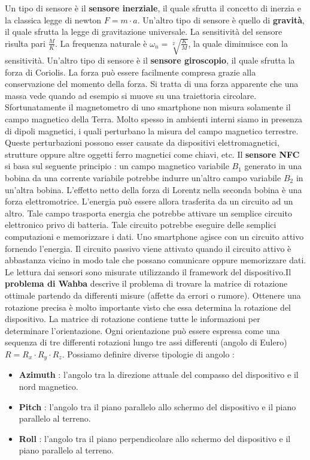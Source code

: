 \documentclass[12pt]{report}
\begin{document}
Un tipo di sensore è il \textbf{sensore inerziale}, il quale sfrutta il concetto di inerzia e la classica legge di newton $F = m\cdot a$. Un'altro tipo di sensore è quello di \textbf{gravità}, il quale sfrutta la legge di gravitazione universale. La sensitività del sensore risulta pari $\frac{M}{K}$. La frequenza naturale è $\omega_n = \sqrt[2]{\frac{K}{M}}$, la quale diminuisce con la sensitività. Un'altro tipo di sensore è il \textbf{sensore giroscopio}, il quale sfrutta la forza di Coriolis. La forza può essere facilmente compresa grazie alla conservazione del momento della forza. Si tratta di una forza apparente che una massa vede quando ad esempio si muove su una traiettoria circolare. Sfortunatamente il magnetometro di uno smartphone non misura solamente il campo magnetico della Terra. Molto spesso in ambienti interni siamo in presenza di dipoli magnetici, i quali perturbano la misura del campo magnetico terrestre. Queste perturbazioni possono esser causate da dispositivi elettromagnetici, strutture oppure altre oggetti ferro magnetici come chiavi, etc. Il \textbf{sensore NFC} si basa sul seguente principio : un campo magnetico variabile $B_1$ generato in una bobina da una corrente variabile potrebbe indurre un'altro campo variabile $B_2$ in un'altra bobina. L'effetto netto della forza di Lorentz nella seconda bobina è una forza elettromotrice. L'energia può essere allora trasferita da un circuito ad un altro. Tale campo trasporta energia che potrebbe attivare un semplice circuito elettronico privo di batteria. Tale circuito potrebbe eseguire delle semplici computazioni e memorizzare i dati. Uno smartphone agisce con un circuito attivo fornendo l'energia. Il circuito passivo viene attivato quando il circuito attivo è abbastanza vicino in modo tale che possano comunicare oppure memorizzare dati. Le lettura dai sensori sono misurate utilizzando il framework del dispositivo.Il \textbf{problema di Wahba} descrive il problema di trovare la matrice di rotazione ottimale partendo da differenti misure (affette da errori o rumore). Ottenere una rotazione precisa è molto importante visto che essa determina la rotazione del dispositivo. La matrice di rotazione contiene tutte le informazioni per determinare l'orientazione. Ogni orientazione può essere espressa come una sequenza di tre differenti rotazioni lungo tre assi differenti (angolo di Eulero) $R = R_x \cdot R_y \cdot R_z$. Possiamo definire diverse tipologie di angolo :
\begin{itemize}
\item \textbf{Azimuth} : l'angolo tra la direzione attuale del compasso del dispositivo e il nord magnetico.
\item \textbf{Pitch} : l'angolo tra il piano parallelo allo schermo del dispositivo e il piano parallelo al terreno.
\item \textbf{Roll} : l'angolo tra il piano perpendicolare allo schermo del dispositivo e il piano parallelo al terreno.
\end{itemize}
\end{document}

